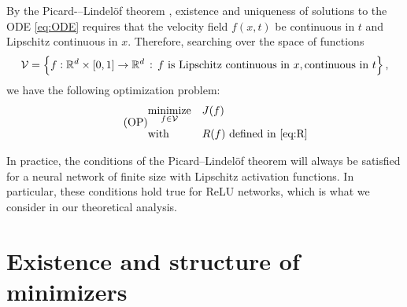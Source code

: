 By the Picard-–Lindel\"{o}f theorem \citep{ArnoldODE}, existence and uniqueness of solutions to the ODE \eqref{eq:ODE} requires that the velocity field $f(x,t)$ be continuous in $t$ and Lipschitz continuous in $x$. Therefore, searching over the space of functions 
  \begin{equation}\label{eq:V}
    \mathcal{V} = \left\{f: \mathbb{R}^d\times[0,1]\rightarrow\mathbb{R}^d\, :\,f \ \text{is Lipschitz continuous in } x, \text{continuous in }t \right\}, \end{equation}
we have the following optimization problem:
  \begin{equation*} \label{eq:OP} \tag{OP}
    \begin{aligned}
      & \underset{f\in\mathcal{V}}{\text{minimize}}
      & & J(f)\\
      & \text{with}
      & & R(f) \text{ defined in } \eqref{eq:R}
    \end{aligned}
  \end{equation*}

\begin{remark}
  In practice, the conditions of the Picard–Lindel\"{o}f theorem will
  always be satisfied for a neural network of finite size with Lipschitz activation functions. In particular, these conditions hold true for ReLU networks, which is what we consider in our theoretical analysis.
\end{remark}





\section{Existence and structure of minimizers}\label{sec:minimizers}







